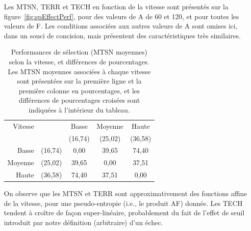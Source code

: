 	Les MTSN, TERR et TECH en fonction de la vitesse sont présentés sur la figure~\ref{fig:spEffectPerf}, pour des valeurs de A de 60 et 120, et pour toutes les valeurs de F. Les conditions associées aux autres valeurs de A sont omises ici, dans un souci de concision, mais présentent des caractéristiques très similaires.
	
	\begin{table}
		\centering
		\begin{tabular}{r c | c c c}
			Vitesse			&			& Basse		& Moyenne	& Haute		\bigstrut[b] \\
							&			& (16,74)	& (25,02)	& (36,58)	\bigstrut[b] \\ \hline
			Basse			& (16,74)	& 0,00		& 39,65		& 74,40		\bigstrut[t] \\
			Moyenne			& (25,02)	& 39,65		& 0,00		& 37,51		\\
			Haute			& (36,58)	& 74,40		& 37,51		& 0,00		\\
		\end{tabular}
		\caption[Performances selon la vitesse]{Performances de sélection (MTSN moyennes) selon la vitesse, et différences de pourcentages. Les MTSN moyennes associées à chaque vitesse sont présentées sur la première ligne et la première colonne en pourcentages, et les différences de pourcentages croisées sont indiquées à l'intérieur du tableau.}
		\label{tab:spPerf}
	\end{table}
	
	On observe que les MTSN et TERR sont approximativement des fonctions affine de la vitesse, pour une pseudo-entropie (i.e., le produit AF) donnée. Les TECH tendent à croître de façon super-linéaire, probablement du fait de l'effet de seuil introduit par notre définition (arbitraire) d'un échec.

